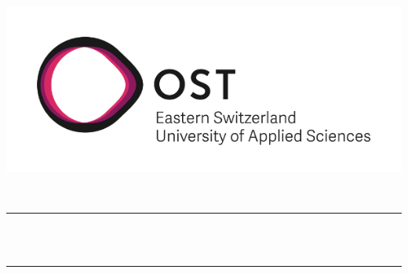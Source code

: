 


\begin{titlepage}


   \vspace*{\fill}

   \newcommand{\HRule}{\color{black}\rule{\linewidth}{0.5mm}} %

   \center

   \includegraphics[scale=1]{./img/OST_Logo}

   \vspace{0.5cm}

   \textsc{\huge \SUBJECT}\\[1cm]

   {\HRule} \\[0.7cm]
   { \Huge \bfseries \textcolor{OSTPink}{\TITLE}}\\[0.4cm]
   {\HRule} \\[1.1cm]

   \Large \AUTHOR

   \Large \VERSION


   \vfill %

\end{titlepage}


\setcounter{tocdepth}{2}

\tableofcontents

